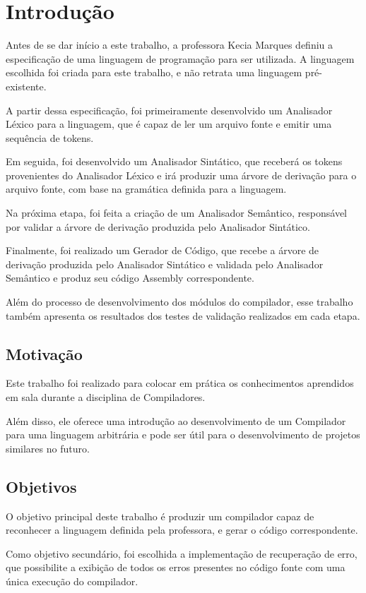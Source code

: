 \chapter{Introdução}
\label{cap:intro}
Antes de se dar início a este trabalho, a professora Kecia Marques definiu a especificação de uma linguagem de programação para ser utilizada. A linguagem escolhida foi criada para este trabalho, e não retrata uma linguagem pré-existente.

A partir dessa especificação, foi primeiramente desenvolvido um Analisador Léxico para a linguagem, que é capaz de ler um arquivo fonte e emitir uma sequência de tokens.

Em seguida, foi desenvolvido um Analisador Sintático, que receberá os tokens provenientes do Analisador Léxico e irá produzir uma árvore de derivação para o arquivo fonte, com base na gramática definida para a linguagem.

Na próxima etapa, foi feita a criação de um Analisador Semântico, responsável por validar a árvore de derivação produzida pelo Analisador Sintático.

Finalmente, foi realizado um Gerador de Código, que recebe a árvore de derivação produzida pelo Analisador Sintático e validada pelo Analisador Semântico e produz seu código Assembly correspondente.

Além do processo de desenvolvimento dos módulos do compilador, esse trabalho também apresenta os resultados dos testes de validação realizados em cada etapa.

\section{Motivação}
\label{sec:motivacao}

Este trabalho foi realizado para colocar em prática os conhecimentos aprendidos em sala durante a disciplina de Compiladores.

Além disso, ele oferece uma introdução ao desenvolvimento de um Compilador para uma linguagem arbitrária e pode ser útil para o desenvolvimento de projetos similares no futuro.

\section{Objetivos}
\label{sec:objetivos}

O objetivo principal deste trabalho é produzir um compilador capaz de reconhecer a linguagem definida pela professora, e gerar o código correspondente.

Como objetivo secundário, foi escolhida a implementação de recuperação de erro, que possibilite a exibição de todos os erros presentes no código fonte com uma única execução do compilador.